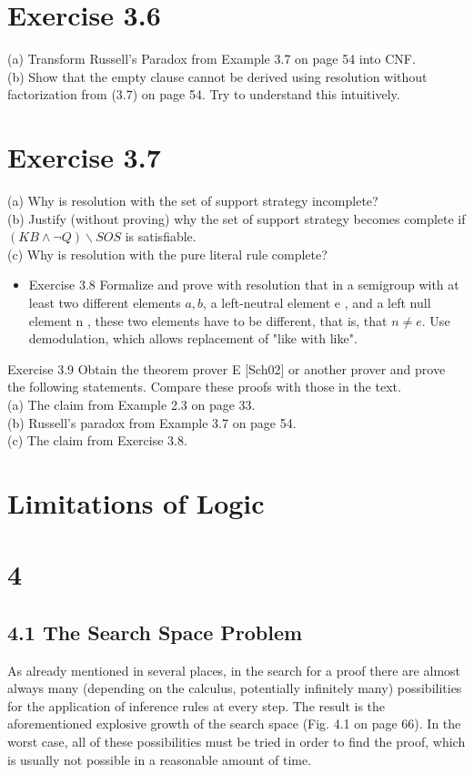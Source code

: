 \documentclass[10pt]{article}
\begin{document}
\section*{Exercise 3.6}
(a) Transform Russell's Paradox from Example 3.7 on page 54 into CNF.\\
(b) Show that the empty clause cannot be derived using resolution without factorization from (3.7) on page 54. Try to understand this intuitively.

\section*{Exercise 3.7}
(a) Why is resolution with the set of support strategy incomplete?\\
(b) Justify (without proving) why the set of support strategy becomes complete if $(K B \wedge \neg Q) \backslash S O S$ is satisfiable.\\
(c) Why is resolution with the pure literal rule complete?

\begin{itemize}
  \item Exercise 3.8 Formalize and prove with resolution that in a semigroup with at least two different elements $a, b$, a left-neutral element e , and a left null element n , these two elements have to be different, that is, that $n \neq e$. Use demodulation, which allows replacement of "like with like".
\end{itemize}

Exercise 3.9 Obtain the theorem prover E [Sch02] or another prover and prove the following statements. Compare these proofs with those in the text.\\
(a) The claim from Example 2.3 on page 33.\\
(b) Russell's paradox from Example 3.7 on page 54.\\
(c) The claim from Exercise 3.8.

\section*{Limitations of Logic}
\section*{4}
\subsection*{4.1 The Search Space Problem}
As already mentioned in several places, in the search for a proof there are almost always many (depending on the calculus, potentially infinitely many) possibilities for the application of inference rules at every step. The result is the aforementioned explosive growth of the search space (Fig. 4.1 on page 66). In the worst case, all of these possibilities must be tried in order to find the proof, which is usually not possible in a reasonable amount of time.
\end{document}
